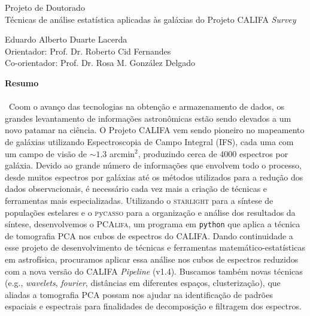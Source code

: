 \documentclass[a4paper,12pt]{article}
\newcommand\pycasso{\textsc{p}y\textsc{casso}\xspace}
\newcommand\pcalifa{PCA\textsc{lifa}\xspace}
\def\starlight{\textsc{starlight}\xspace}      %
\begin{document}
\begin{center}
	\LARGE{Projeto de Doutorado}\\ \bigskip\large{Técnicas de análise estatística aplicadas às galáxias do Projeto CALIFA {\em Survey}}
\end{center}

\vspace{1cm}

\begin{flushleft}
	Eduardo Alberto Duarte Lacerda\\
	Orientador: Prof. Dr. Roberto Cid Fernandes\\
	Co-orientador: Prof. Dr. Rosa M. González Delgado
\end{flushleft}

\begin{center}
	\textbf{Resumo}
\end{center}
\paragraph{}\ Coom o avanço das tecnologias na obtenção e armazenamento de dados, os grandes levantamento de informações astronômicas estão sendo
elevados a um novo patamar na ciência. O Projeto CALIFA vem sendo pioneiro no mapeamento de galáxias utilizando Espectroscopia de Campo Integral
(IFS), cada uma com um campo de visão de $\sim1.3$ arcmin${}^2$, produzindo cerca de 4000 espectros por galáxia. Devido ao grande número de
informações que envolvem todo o processo, desde muitos espectros por galáxias até os métodos utilizados para a redução dos dados observacionais, é
necessário cada vez mais a criação de técnicas e ferramentas mais especializadas. Utilizando o \starlight para a síntese de populações estelares e o
\pycasso para a organização e análise dos resultados da síntese, desenvolvemos o \pcalifa, um programa em \texttt{python} que aplica a técnica de
tomografia PCA nos cubos de espectros do CALIFA. Dando continuidade a esse projeto de desenvolvimento de técnicas e ferramentas
matemático-estatísticas em astrofísica, procuramos aplicar essa análise nos cubos de espectros reduzidos com a nova versão do CALIFA {\em Pipeline}
(v1.4). Buscamos também novas técnicas (e.g., {\em wavelets}, {\em fourier}, distâncias em diferentes espaços, clusterização), que aliadas a
tomografia PCA possam nos ajudar na identificação de padrões espaciais e espectrais para finalidades de decomposição e filtragem dos espectros.
	
\end{document}
